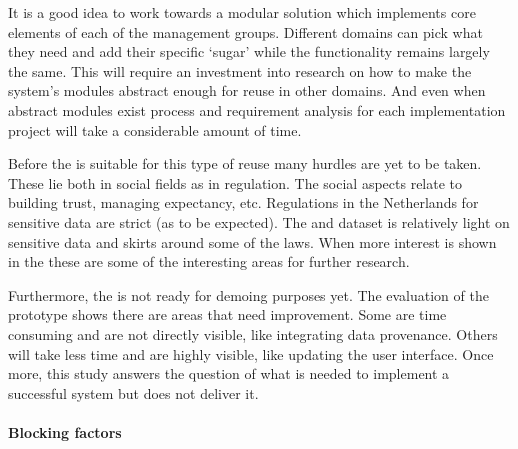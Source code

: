 It is a good idea to work towards a modular solution which implements core elements of each of the management groups.
Different domains can pick what they need and add their specific `sugar' while the functionality remains largely the same.
This will require an investment into research on how to make the system's modules abstract enough for reuse in other domains.
And even when abstract modules exist process and requirement analysis for each implementation project will take a considerable amount of time.

Before the \ivfsystem{} is suitable for this type of reuse many hurdles are yet to be taken.
These lie both in social fields as in regulation.
The social aspects relate to building trust, managing expectancy, etc.
Regulations in the Netherlands for sensitive data are strict (as to be expected).
The \IVF{} and \PRN{} dataset is relatively light on sensitive data and skirts around some of the laws.
When more interest is shown in the \ivfsystem{} these are some of the interesting areas for further research.

Furthermore, the \ivfsystem{} is not ready for demoing purposes yet.
The evaluation of the prototype shows there are areas that need improvement.
Some are time consuming and are not directly visible, like integrating data provenance.
Others will take less time and are highly visible, like updating the user interface.
Once more, this study answers the question of what is needed to implement a successful system but does not deliver it.

\paragraph{Blocking factors}



